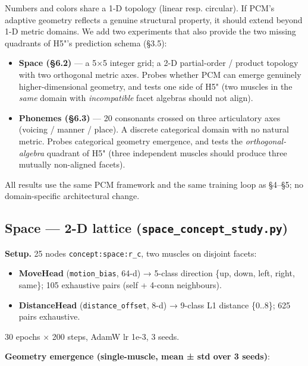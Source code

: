 Numbers and colors share a 1-D topology (linear resp. circular). If
PCM's adaptive geometry reflects a genuine structural property, it
should extend beyond 1-D metric domains. We add two experiments that
also provide the two missing quadrants of H5"'s prediction schema
(§3.5):

\begin{itemize}
\tightlist
\item
  \textbf{Space (§6.2)} --- a 5×5 integer grid; a 2-D partial-order / product
  topology with two orthogonal metric axes. Probes whether PCM can
  emerge genuinely higher-dimensional geometry, and tests one side of
  H5" (two muscles in the \emph{same} domain with \emph{incompatible} facet
  algebras should not align).
\item
  \textbf{Phonemes (§6.3)} --- 20 consonants crossed on three articulatory
  axes (voicing / manner / place). A discrete categorical domain with
  no natural metric. Probes categorical geometry emergence, and tests
  the \emph{orthogonal-algebra} quadrant of H5" (three independent muscles
  should produce three mutually non-aligned facets).
\end{itemize}

All results use the same PCM framework and the same training loop as
§4--§5; no domain-specific architectural change.

\subsection{\texorpdfstring{Space --- 2-D lattice (\texttt{space\_concept\_study.py})}{Space --- 2-D lattice (space\_concept\_study.py)}}

\textbf{Setup.} 25 nodes \texttt{concept:space:r\_c}, two muscles on disjoint
facets:

\begin{itemize}
\tightlist
\item
  \textbf{MoveHead} (\texttt{motion\_bias}, 64-d) → 5-class direction
  \{up, down, left, right, same\}; 105 exhaustive pairs (self + 4-conn
  neighbours).
\item
  \textbf{DistanceHead} (\texttt{distance\_offset}, 8-d) → 9-class L1 distance
  \{0..8\}; 625 pairs exhaustive.
\end{itemize}

30 epochs × 200 steps, AdamW lr 1e-3, 3 seeds.

\textbf{Geometry emergence (single-muscle, mean ± std over 3 seeds)}:

